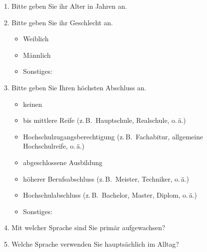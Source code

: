 
\begin{enumerate}[resume]
\item \label{App1:IA} Bitte geben Sie ihr Alter in Jahren an.\\
	   \underline{\hspace{7.5cm}}


\item Bitte geben Sie ihr Geschlecht an.

		\begin{itemize}
		\item[\Circle] Weiblich 
        \item[\Circle] Männlich 
        \item[\Circle] Sonstiges:~\underline{\hspace{7.5cm}}\\
        \end{itemize}
        
        
\item Bitte geben Sie Ihren höchsten Abschluss an.

		\begin{itemize}
        \item[\Circle] keinen
		\item[\Circle] bis mittlere Reife (z.\,B.\ Hauptschule, Realschule, o.\,ä.)
        \item[\Circle] Hochschulzugangsberechtigung (z.\,B.\ Fachabitur, allgemeine Hochschulreife, o.\,ä.)
       	\item[\Circle] abgeschlossene Ausbildung
        \item[\Circle] höherer Berufsabschluss (z.\,B.\ Meister, Techniker, o.\,ä.)
        \item[\Circle] Hochschulabschluss (z.\,B.\ Bachelor, Master, Diplom, o.\,ä.)
        \item[\Circle] Sonstiges:~\underline{\hspace{7.5cm}}
        \end{itemize}


\item Mit welcher Sprache sind Sie primär aufgewachsen?\\
	   \underline{\hspace{7.5cm}}

\item Welche Sprache verwenden Sie hauptsächlich im Alltag?\\
	   \underline{\hspace{7.5cm}}


\end{enumerate}
